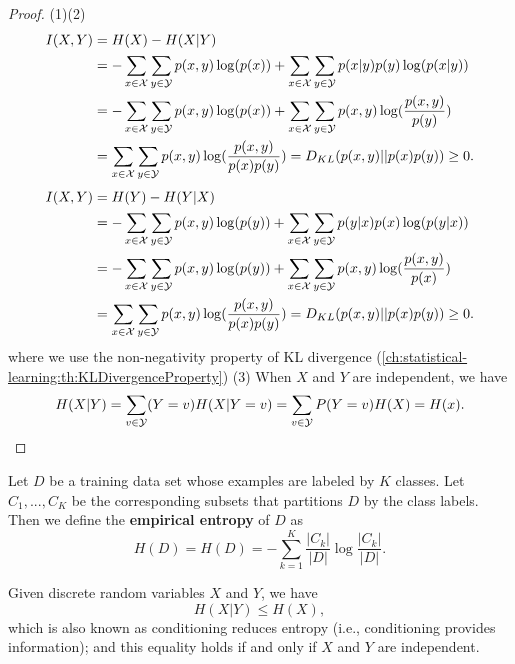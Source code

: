 \begin{refsection}
\begin{proof}
	(1)(2)
	\begin{align*}
	I(X,Y)&=H(X)-H(X|Y)\\
	&=-\sum_{x\in \mathcal{X}}\sum_{y\in \mathcal{Y}}p(x,y)\log(p(x)) + \sum_{x\in \mathcal{X}}\sum_{y\in \mathcal{Y}} p(x|y)p(y)\log(p(x|y))\\
	& = -\sum_{x\in \mathcal{X}}\sum_{y\in \mathcal{Y}}p(x,y)\log(p(x)) + \sum_{x\in \mathcal{X}}\sum_{y\in \mathcal{Y}} p(x,y)\log(\frac{p(x,y)}{p(y)})\\
	& = \sum_{x\in \mathcal{X}}\sum_{y\in \mathcal{Y}} p(x,y)\log(\frac{p(x,y)}{p(x)p(y)}) = D_{KL}(p(x,y)||p(x)p(y)) \geq 0.
	\end{align*}
	\begin{align*}
	I(X,Y)&=H(Y)-H(Y|X)\\
	&=-\sum_{x\in \mathcal{X}}\sum_{y\in \mathcal{Y}}p(x,y)\log(p(y)) + \sum_{x\in \mathcal{X}}\sum_{y\in \mathcal{Y}} p(y|x)p(x)\log(p(y|x))\\
	& = -\sum_{x\in \mathcal{X}}\sum_{y\in \mathcal{Y}}p(x,y)\log(p(y)) + \sum_{x\in \mathcal{X}}\sum_{y\in \mathcal{Y}} p(x,y)\log(\frac{p(x,y)}{p(x)})\\
	& = \sum_{x\in \mathcal{X}}\sum_{y\in \mathcal{Y}} p(x,y)\log(\frac{p(x,y)}{p(x)p(y)}) = D_{KL}(p(x,y)||p(x)p(y)) \geq 0.
	\end{align*}
	where we use the non-negativity property of KL divergence (\autoref{ch:statistical-learning:th:KLDivergenceProperty})
	(3) When $X$ and $Y$ are independent, we have
	$$H(X|Y) = \sum_{v\in \mathcal{Y}}(Y=v)H(X|Y=v) = \sum_{v\in \mathcal{Y}}P(Y=v)H(X) = H(x).$$
\end{proof}

\begin{definition}
	Let $D$ be a training data set whose examples are labeled by $K$ classes. Let $C_1,...,C_K$ be the corresponding subsets that partitions $D$ by the class labels. Then we define the \textbf{empirical entropy} of $D$ as
	$$H(D) = H(D)=-\sum_{k=1}^{K} \frac{\left|C_{k}\right|}{|D|} \log \frac{\left|C_{k}\right|}{|D|}.$$	
\end{definition}



\begin{corollary}
	Given discrete random variables $X$ and $Y$, we have
	$$H(X|Y) \leq H(X),$$ which is also known as conditioning reduces entropy (i.e., conditioning provides information); and this equality holds if and only if $X$ and $Y$ are independent.\\	
\end{corollary}



\end{refsection}
